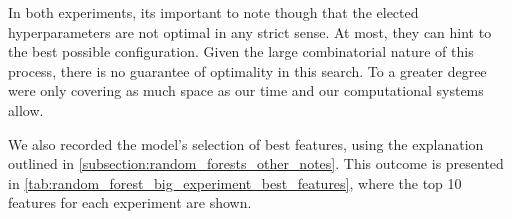 In both experiments, its important to note though that the elected hyperparameters are not optimal in any strict sense.
At most, they can hint to the best possible configuration.
Given the large combinatorial nature of this process, there is no guarantee of optimality in this search.
To a greater degree were only covering as much space as our time and our computational systems allow.


We also recorded the model's selection of best features, using the explanation outlined in \cref{subsection:random_forests_other_notes}.
This outcome is presented in \cref{tab:random_forest_big_experiment_best_features}, where the top 10 features for each experiment are shown.

\begin{table}[ht]
    \centering
    \caption{A representation of the top features that resulted from the Random Forest experiment on \cref{target4}. }\label{tab:random_forest_big_experiment_best_features}
\end{table}


